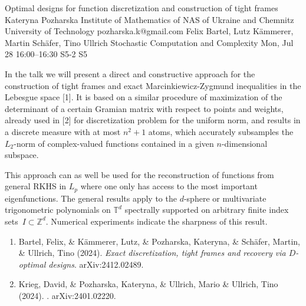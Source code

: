 \begin{talk}
  {Optimal designs for function discretization and construction of tight frames}%
  {Kateryna Pozharska}%
  {Institute of Mathematics of NAS of Ukraine and Chemnitz University of Technology}%
  {pozharska.k@gmail.com}%
  {Felix Bartel,  Lutz K\"ammerer,  Martin Sch\"afer, Tino Ullrich}%
  {Stochastic Computation and Complexity}%
  {Mon, Jul 28 16:00--16:30}%
  {S5-2}%
  {S5}%
    


In the talk we will present a direct and constructive approach for the construction of tight frames and exact Marcinkiewicz-Zygmund inequalities in the Lebesgue space [1]. 
It is based on a similar procedure of maximization of the determinant of a certain Gramian matrix with respect to points and weights, already used in [2] for discretization problem for the uniform norm, and results in a discrete measure  with at most $n^2+1$ atoms, which accurately subsamples the $L_2$-norm of complex-valued functions contained in a  given $n$-dimensional subspace.

This approach can as well be used for the reconstruction of functions from general RKHS in $L_p$ where one only has access to the most important eigenfunctions. The general results apply to the $d$-sphere or multivariate trigonometric polynomials on $\mathbb{T}^d$ spectrally supported on arbitrary finite index sets~$I \subset \mathbb{Z}^d$.  Numerical experiments indicate the sharpness of this result. 


\begin{enumerate}
 \item[{[1]}]  Bartel, Felix,  \& K\"ammerer, Lutz,  \& Pozharska,  Kateryna, \& Sch\"afer, Martin,  \& \newline Ullrich, Tino (2024). {\it Exact discretization, tight frames and recovery via $D$-optimal designs}. arXiv:2412.02489.
    
 \item[{[2]}] Krieg, David, \&  Pozharska, Kateryna, \& Ullrich, Mario \&  Ullrich, Tino (2024). . arXiv:2401.02220.

\end{enumerate}


\end{talk}

